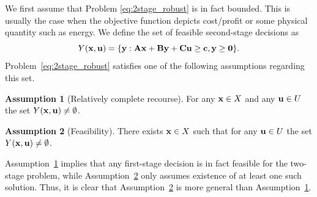 \documentclass[12pt,x11names]{article}
\theoremstyle{definition}
\newtheorem{assumption}{Assumption}{{\Alph{assumption}}}
\newcommand{\bzero}{{\bf 0}}
\newcommand{\bc}{{\bf c}}
\newcommand{\bu}{{\bf u}}
\newcommand{\bx}{{\bf x}}
\newcommand{\by}{{\bf y}}
\newcommand{\bba}{{\bf A}}
\newcommand{\bbb}{{\bf B}}
\newcommand{\bbc}{{\bf C}}
\begin{document}
We first assume that Problem \eqref{eq:2stage_robust} is in fact bounded. This is usually the case when the objective function depicts cost/profit or some physical quantity such as energy.
We define the set of feasible second-stage decisions as
\begin{equation}
Y(\bx,\bu)=\{\by:\bba\bx+\bbb\by+\bbc\bu\geq \bc, \by\geq \bzero\}.
\end{equation} 
Problem~\eqref{eq:2stage_robust} satisfies one of the following assumptions regarding this set.
\begin{assumption}[Relatively complete
recourse]\label{ass:full recourse}
For any $\bx\in X$ and any $\bu\in U$ the set  $Y(\bx,\bu)\neq \emptyset$.
\end{assumption}
\begin{assumption}[Feasibility]\label{ass:feasibility}
There exists $\bx\in X$ such that for any $\bu\in U$ the set  $Y(\bx,\bu)\neq \emptyset$.
\end{assumption}
Assumption~\ref{ass:full recourse} implies that any first-stage decision is in fact feasible for the two-stage problem, while Assumption~\ref{ass:feasibility} only assumes existence of at least one such solution. Thus, it is clear that Assumption~\ref{ass:feasibility} is more general than Assumption~\ref{ass:full recourse}.
\end{document}
